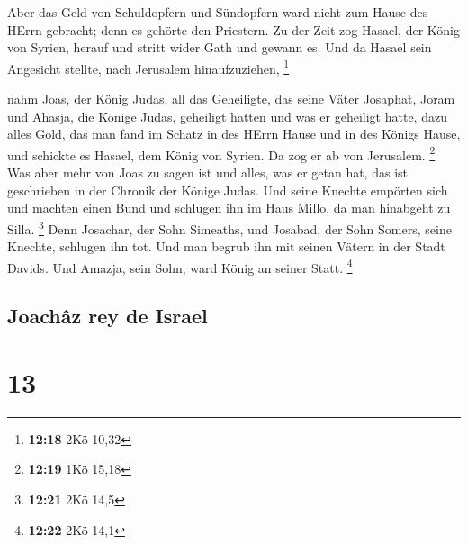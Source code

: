  Aber das Geld von Schuldopfern und Sündopfern ward nicht
zum Hause des HErrn gebracht; denn es gehörte den Priestern.
 Zu der Zeit zog Hasael, der König von Syrien, herauf und
stritt wider Gath und gewann es. Und da Hasael sein Angesicht stellte,
nach Jerusalem hinaufzuziehen, \footnote{\textbf{12:18} 2Kö 10,32}

 nahm Joas, der König Judas, all das Geheiligte, das
seine Väter Josaphat, Joram und Ahasja, die Könige Judas, geheiligt
hatten und was er geheiligt hatte, dazu alles Gold, das man fand im
Schatz in des HErrn Hause und in des Königs Hause, und schickte es
Hasael, dem König von Syrien. Da zog er ab von Jerusalem. \footnote{\textbf{12:19}
  1Kö 15,18}  Was aber mehr von Joas zu sagen ist und
alles, was er getan hat, das ist geschrieben in der Chronik der Könige
Judas.  Und seine Knechte empörten sich und machten einen
Bund und schlugen ihn im Haus Millo, da man hinabgeht zu Silla.
\footnote{\textbf{12:21} 2Kö 14,5}  Denn Josachar, der
Sohn Simeaths, und Josabad, der Sohn Somers, seine Knechte, schlugen ihn
tot. Und man begrub ihn mit seinen Vätern in der Stadt Davids. Und
Amazja, sein Sohn, ward König an seiner Statt. \footnote{\textbf{12:22}
  2Kö 14,1}

\hypertarget{joachuxe2z-rey-de-israel}{%
\subsection{Joachâz rey de Israel}\label{joachuxe2z-rey-de-israel}}

\hypertarget{section-12}{%
\section{13}\label{section-12}}

